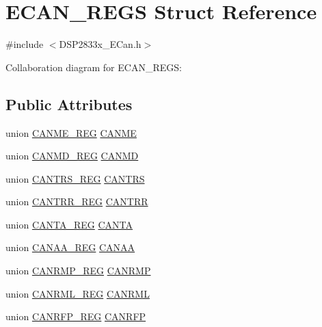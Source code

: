 \hypertarget{struct_e_c_a_n___r_e_g_s}{}\section{E\+C\+A\+N\+\_\+\+R\+E\+G\+S Struct Reference}
\label{struct_e_c_a_n___r_e_g_s}


{\ttfamily \#include $<$D\+S\+P2833x\+\_\+\+E\+Can.\+h$>$}



Collaboration diagram for E\+C\+A\+N\+\_\+\+R\+E\+G\+S\+:
\subsection*{Public Attributes}
\begin{DoxyCompactItemize}
\item 
union \hyperlink{union_c_a_n_m_e___r_e_g}{C\+A\+N\+M\+E\+\_\+\+R\+E\+G} \hyperlink{struct_e_c_a_n___r_e_g_s_a92c63703f2a9bac3d0e65cfcc4236293}{C\+A\+N\+M\+E}
\item 
union \hyperlink{union_c_a_n_m_d___r_e_g}{C\+A\+N\+M\+D\+\_\+\+R\+E\+G} \hyperlink{struct_e_c_a_n___r_e_g_s_a4fc3dd79dffdbbb02e7c53d1746704ed}{C\+A\+N\+M\+D}
\item 
union \hyperlink{union_c_a_n_t_r_s___r_e_g}{C\+A\+N\+T\+R\+S\+\_\+\+R\+E\+G} \hyperlink{struct_e_c_a_n___r_e_g_s_af0e518a292dd9a2dd49768bb860889df}{C\+A\+N\+T\+R\+S}
\item 
union \hyperlink{union_c_a_n_t_r_r___r_e_g}{C\+A\+N\+T\+R\+R\+\_\+\+R\+E\+G} \hyperlink{struct_e_c_a_n___r_e_g_s_aadeb18b55adca53969eb22031e0973b2}{C\+A\+N\+T\+R\+R}
\item 
union \hyperlink{union_c_a_n_t_a___r_e_g}{C\+A\+N\+T\+A\+\_\+\+R\+E\+G} \hyperlink{struct_e_c_a_n___r_e_g_s_a40651e622f9e7ec891e58800806039fc}{C\+A\+N\+T\+A}
\item 
union \hyperlink{union_c_a_n_a_a___r_e_g}{C\+A\+N\+A\+A\+\_\+\+R\+E\+G} \hyperlink{struct_e_c_a_n___r_e_g_s_ad7be3ced3ac44283e8ef05caca7577d5}{C\+A\+N\+A\+A}
\item 
union \hyperlink{union_c_a_n_r_m_p___r_e_g}{C\+A\+N\+R\+M\+P\+\_\+\+R\+E\+G} \hyperlink{struct_e_c_a_n___r_e_g_s_afc546cb1df4e35df2cec5210bfe2f3c5}{C\+A\+N\+R\+M\+P}
\item 
union \hyperlink{union_c_a_n_r_m_l___r_e_g}{C\+A\+N\+R\+M\+L\+\_\+\+R\+E\+G} \hyperlink{struct_e_c_a_n___r_e_g_s_a8dda317c2e6ee826fc5f9cb334a82266}{C\+A\+N\+R\+M\+L}
\item 
union \hyperlink{union_c_a_n_r_f_p___r_e_g}{C\+A\+N\+R\+F\+P\+\_\+\+R\+E\+G} \hyperlink{struct_e_c_a_n___r_e_g_s_a692d8a9423c80a2b824d11299549de99}{C\+A\+N\+R\+F\+P}

\end{DoxyCompactItemize}
